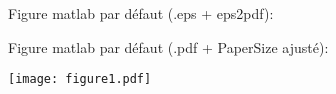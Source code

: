 \documentclass[12pt]{article}
\begin{document}
Figure matlab par défaut (.eps + eps2pdf):

\centerline{}	

\pagebreak

Figure matlab par défaut (.pdf + PaperSize ajusté):

\centerline{}	

\pagebreak

\noindent\texttt{[image: figure1.pdf]}

\noindent{}

\noindent
\begin{minipage}{.48\textwidth}
   \centerline{}
\end{minipage} \hfill
\begin{minipage}{.48\textwidth}
   \centerline{}
\end{minipage}
\end{document}
